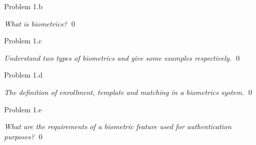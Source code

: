 \documentclass[
        ]{beamer}
\begin{document}
        \begin{frame}[c]{Problem 1.b}
    				\begin{overprint}
            	\emph{What is biometrics?}
                \qed
            \end{overprint}            
        \end{frame}
        
        
        
        
        
        \begin{frame}[c]{Problem 1.c}
    				\begin{overprint}
            	\emph{Understand two types of biometrics and give some examples respectively.}
                \qed
            \end{overprint}            
        \end{frame}
        
        
        
        \begin{frame}[c]{Problem 1.d}
    				\begin{overprint}
            	\emph{The definition of enrollment, template and matching in a biometrics system.}
                \qed
            \end{overprint}            
        \end{frame}
        
        
        
        \begin{frame}[c]{Problem 1.e}
    				\begin{overprint}
            	\emph{What are the requirements of a biometric feature used for authentication purposes? }
                \qed
            \end{overprint}
        \end{frame}
        
\end{document}
